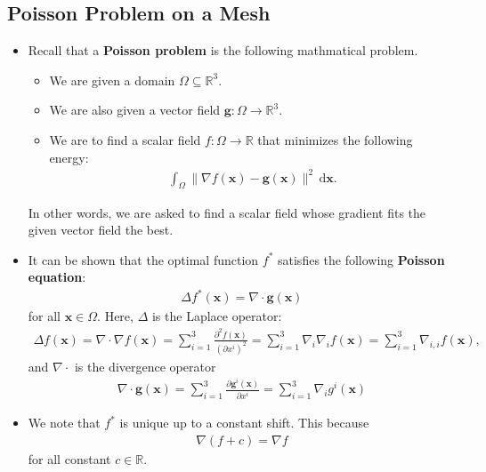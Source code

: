 \documentclass[10pt]{article}
\newcommand{\dee}{\mathrm{d}}
\newcommand{\ve}[1]{\mathbf{#1}}
\newcommand{\ra}{\rightarrow}
\newcommand{\Real}{\mathbb{R}}
\begin{document}
\subsection{Poisson Problem on a Mesh}

\begin{itemize}
    \item Recall that a {\bf Poisson problem} is the following mathmatical problem.
    \begin{itemize}
        \item We are given a domain $\Omega \subseteq \Real^3$.
        \item We are also given a vector field $\ve{g}: \Omega \ra \Real^3$.
        \item We are to find a scalar field $f: \Omega \ra \Real$ that minimizes the following energy:
        \begin{align*}
            \int_{\Omega} \| \nabla f(\ve{x}) - \ve{g}(\ve{x}) \|^2\, \dee \ve{x}.
        \end{align*}
    \end{itemize}
    In other words, we are asked to find a scalar field whose gradient fits the given vector field the best.

    \item It can be shown that the optimal function $f^*$ satisfies the following {\bf Poisson equation}:
    \begin{align*}
        \Delta f^*(\ve{x}) = \nabla \cdot \ve{g}(\ve{x})
    \end{align*}
    for all $\ve{x} \in \Omega$. Here, $\Delta$ is the Laplace operator:
    \begin{align*}
        \Delta f(\ve{x}) = \nabla \cdot \nabla f(\ve{x}) 
        = \sum_{i=1}^3 \frac{\partial^2 f(\ve{x})}{(\partial x^i)^2}
        = \sum_{i=1}^3 \nabla_i \nabla_i f(\ve{x})
        = \sum_{i=1}^3 \nabla_{i,i} f(\ve{x}),
    \end{align*}
    and $\nabla \cdot$ is the divergence operator
    \begin{align*}
        \nabla \cdot \ve{g}(\ve{x}) = \sum_{i=1}^3 \frac{\partial \ve{g}^i(\ve{x})}{\partial x^i} = \sum_{i=1}^3 \nabla_i g^i(\ve{x})
    \end{align*}

    \item We note that $f^*$ is unique up to a constant shift. This because
    \begin{align*}
        \nabla (f + c) = \nabla f
    \end{align*}
    for all constant $c \in \Real$.


\end{itemize}
\end{document}
